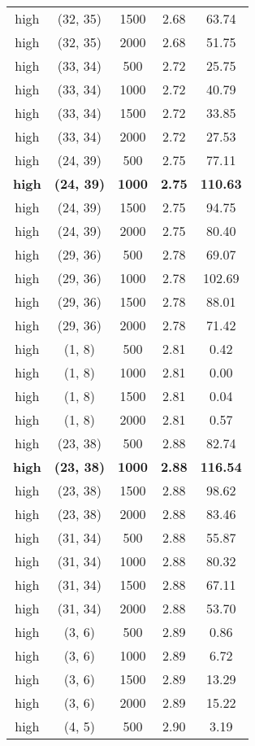 \begin{tabular}{c c c c c}
high & (32, 35) &  1500 & 2.68 & 63.74 \\
high & (32, 35) &  2000 & 2.68 & 51.75 \\
high & (33, 34) &  500 & 2.72 & 25.75 \\
high & (33, 34) &  1000 & 2.72 & 40.79 \\
high & (33, 34) &  1500 & 2.72 & 33.85 \\
high & (33, 34) &  2000 & 2.72 & 27.53 \\
high & (24, 39) &  500 & 2.75 & 77.11 \\
\textbf{high} & \textbf{(24, 39)} & \textbf{ 1000} & \textbf{2.75} & \textbf{110.63} \\
high & (24, 39) &  1500 & 2.75 & 94.75 \\
high & (24, 39) &  2000 & 2.75 & 80.40 \\
high & (29, 36) &  500 & 2.78 & 69.07 \\
high & (29, 36) &  1000 & 2.78 & 102.69 \\
high & (29, 36) &  1500 & 2.78 & 88.01 \\
high & (29, 36) &  2000 & 2.78 & 71.42 \\
high & (1, 8) &  500 & 2.81 & 0.42 \\
high & (1, 8) &  1000 & 2.81 & 0.00 \\
high & (1, 8) &  1500 & 2.81 & 0.04 \\
high & (1, 8) &  2000 & 2.81 & 0.57 \\
high & (23, 38) &  500 & 2.88 & 82.74 \\
\textbf{high} & \textbf{(23, 38)} & \textbf{ 1000} & \textbf{2.88} & \textbf{116.54} \\
high & (23, 38) &  1500 & 2.88 & 98.62 \\
high & (23, 38) &  2000 & 2.88 & 83.46 \\
high & (31, 34) &  500 & 2.88 & 55.87 \\
high & (31, 34) &  1000 & 2.88 & 80.32 \\
high & (31, 34) &  1500 & 2.88 & 67.11 \\
high & (31, 34) &  2000 & 2.88 & 53.70 \\
high & (3, 6) &  500 & 2.89 & 0.86 \\
high & (3, 6) &  1000 & 2.89 & 6.72 \\
high & (3, 6) &  1500 & 2.89 & 13.29 \\
high & (3, 6) &  2000 & 2.89 & 15.22 \\
high & (4, 5) &  500 & 2.90 & 3.19 \\

\end{tabular}

